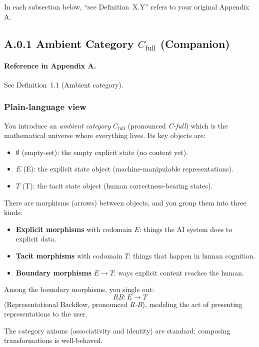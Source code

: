 In each subsection below, ``see Definition~X.Y'' refers to your original Appendix A.

\subsection{A.0.1 Ambient Category $C_{\text{full}}$ (Companion)}

\paragraph{Reference in Appendix A.}
See Definition~1.1 (Ambient category).

\subsubsection*{Plain-language view}

You introduce an \emph{ambient category} $C_{\text{full}}$ (pronounced \emph{C-full}) which is the 
mathematical universe where everything lives. Its key objects are:

\begin{itemize}
 \item $\emptyset$ (empty-set): the empty explicit state (no content yet).
 \item $E$ (E): the explicit state object (machine-manipulable representations).
 \item $T$ (T): the tacit state object (human correctness-bearing states).
\end{itemize}

There are morphisms (arrows) between objects, and you group them into three kinds:

\begin{itemize}
 \item \textbf{Explicit morphisms} with codomain $E$: things the AI system does to explicit data.
 \item \textbf{Tacit morphisms} with codomain $T$: things that happen in human cognition.
 \item \textbf{Boundary morphisms} $E \to T$: ways explicit content reaches the human.
\end{itemize}

Among the boundary morphisms, you single out:
\[
RB : E \to T
\]
(Representational Backflow, pronounced \emph{R-B}), modeling the act of presenting representations to
the user.

The category axioms (associativity and identity) are standard: composing transformations is 
well-behaved.

